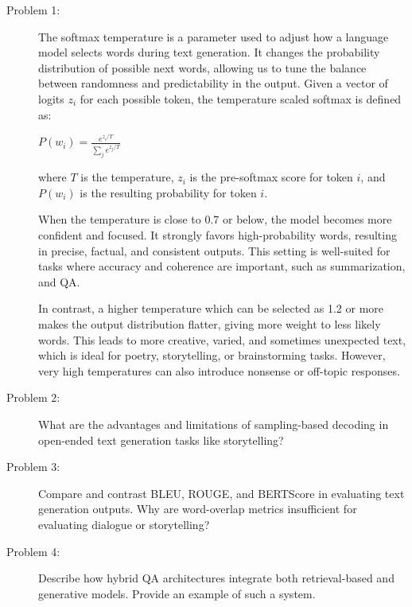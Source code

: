 \documentclass[10pt]{article}
\begin{document}
\begin{description}
\item[Problem 1:] \hfill %

The softmax temperature is a parameter used to adjust how a language model selects words during text generation. 
It changes the probability distribution of possible next words, allowing us to tune the balance between randomness and predictability in the output.
Given a vector of logits $z_i$ for each possible token, the temperature scaled softmax is defined as:

\begin{center}
    $\displaystyle{P(w_i) = \frac{e^{z_i / T}}{\sum_{j} e^{z_j / T}}}$
\end{center}

where $T$ is the temperature, $z_i$ is the pre-softmax score for token $i$, and $P(w_i)$ is the resulting probability for token $i$.

When the temperature is close to 0.7 or below, the model becomes more confident and focused. 
It strongly favors high-probability words, resulting in precise, factual, and consistent outputs. 
This setting is well-suited for tasks where accuracy and coherence are important, 
such as summarization, and QA.

In contrast, a higher temperature which can be selected as 1.2 or more makes the output distribution flatter, 
giving more weight to less likely words. This leads to more creative, varied, and sometimes unexpected text, 
which is ideal for poetry, storytelling, or brainstorming tasks. 
However, very high temperatures can also introduce nonsense or off-topic responses.

\pagebreak

\item[Problem 2:] What are the advantages and limitations of sampling-based decoding in open-ended text generation tasks like storytelling? 

\pagebreak

\item[Problem 3:] Compare and contrast BLEU, ROUGE, and BERTScore in evaluating text generation outputs. Why are word-overlap metrics insufficient for evaluating dialogue or storytelling?

\pagebreak

\item[Problem 4:] Describe how hybrid QA architectures integrate both retrieval-based and generative models. Provide an example of such a system.


\end{description}
\end{document}
